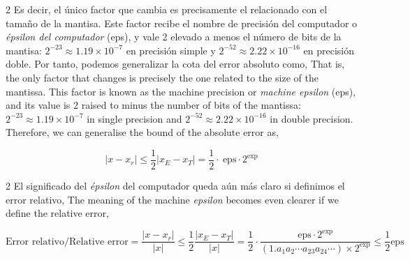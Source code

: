 \begin{paracol}{2}
 Es decir, el único factor que cambia es precisamente el relacionado con el tamaño de la mantisa. Este factor recibe el nombre de precisión del computador o \emph{épsilon del computador} (eps), y vale 2 elevado a menos el número de bits de la mantisa: $2^{-23}\approx 1.19\times 10^{-7}$ en precisión simple y $2^{-52}\approx 2.22\times10^{-16}$ en precisión doble. Por tanto, podemos generalizar la cota del error absoluto como,
\switchcolumn
{} That is, the only factor that changes is precisely the one related to the size of the mantissa. This factor is known as the machine precision or \emph{machine epsilon} (eps), and its value is 2 raised to minus the number of bits of the mantissa: $2^{-23}\approx 1.19\times 10^{-7}$ in single precision and $2^{-52}\approx 2.22\times10^{-16}$ in double precision. Therefore, we can generalise the bound of the absolute error as,
\end{paracol}
  \begin{equation*}
\vert x-x_r \vert \leq \frac{1}{2}\vert x_E-x_T \vert= \frac{1}{2}\cdot\ \text{eps}\cdot2^\text{exp}
\end{equation*}
\begin{paracol}{2}
El significado del \emph{épsilon} del computador queda aún más claro si definimos el error relativo,
\switchcolumn
The meaning of the machine \emph{epsilon} becomes even clearer if we define the relative error,
\end{paracol}
\begin{equation*}
\text{Error relativo/Relative error}=\frac{\vert x-x_r \vert}{\vert x \vert} \leq \frac{1}{2}\frac{\vert x_E-x_T \vert}{\vert x \vert}= \frac{1}{2}\cdot \frac{\text{eps}\cdot2^\text{exp}}{(1.a_1a_2\cdots a_{23}a_{24}\cdots)\times2^{\text{exp}}}\leq \frac{1}{2}\text{eps}
\end{equation*}
